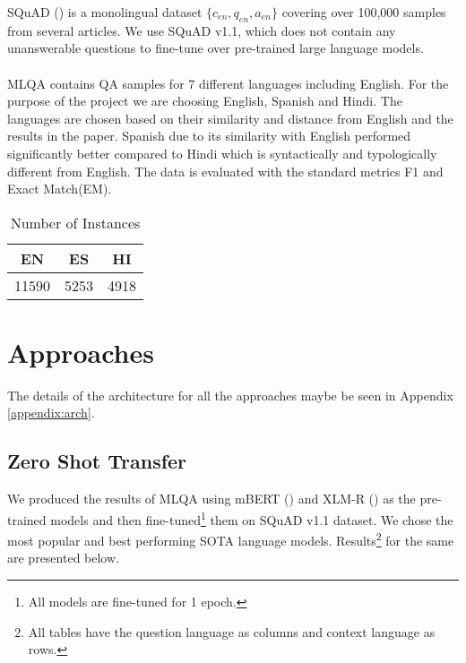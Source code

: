 \documentclass[12pt]{article}   %
\begin{document}
SQuAD (\cite{rajpurkar2016squad}) is a monolingual dataset $\{c_{en}, q_{en}, a_{en}\}$ covering over 100,000 samples from several articles. We use SQuAD v1.1, which does not contain any unanswerable questions to fine-tune over pre-trained large language models.
\\ \\
MLQA contains QA samples for 7 different languages including English. For the purpose of the project we are choosing English, Spanish and Hindi. The languages are chosen based on their similarity and distance from English and the results in the paper. Spanish due to its similarity with English performed significantly better compared to Hindi which is syntactically and typologically different from English. The data is evaluated with the standard metrics F1 and Exact Match(EM).

 \begin{table}[H]
            \centering
		\begin{tabular}{|c|c|c|}
			\hline
 			 \textbf{EN} &  \textbf{ES} &  \textbf{HI} \\
			\hline
			 11590 & 5253 & 4918 \\
			\hline
		\end{tabular}
		\caption{Number of Instances}

\end{table}

\section{Approaches}
The details of the architecture for all the approaches maybe be seen in Appendix \ref{appendix:arch}.
\subsection{Zero Shot Transfer}
We produced the results of MLQA using mBERT (\cite{devlin2018bert}) and XLM-R (\cite{lample2019cross}) as the pre-trained models and then fine-tuned\footnote{\label{epochs}All models are fine-tuned for 1 epoch.} them on SQuAD v1.1 dataset. We chose the most popular and best performing SOTA language models. Results\footnote{\label{result}All tables have the question language as columns and context language as rows.} for the same are presented below.
\end{document}
